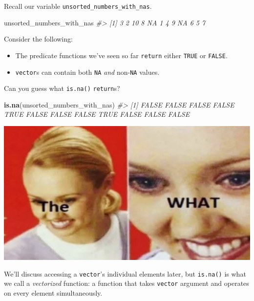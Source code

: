 \documentclass[
]{report}
\newenvironment{Shaded}{\begin{snugshade}}{\end{snugshade}}
\newcommand{\CommentTok}[1]{\textcolor[rgb]{0.56,0.35,0.01}{\textit{#1}}}
\newcommand{\KeywordTok}[1]{\textcolor[rgb]{0.13,0.29,0.53}{\textbf{#1}}}
\newcommand{\NormalTok}[1]{#1}
\providecommand{\tightlist}{%
  \setlength{\itemsep}{0pt}\setlength{\parskip}{0pt}}
\begin{document}
Recall our variable \texttt{unsorted\_numbers\_with\_nas}.

\begin{Shaded}
\begin{Highlighting}[]
\NormalTok{unsorted\_numbers\_with\_nas}
\CommentTok{\#\textgreater{}  [1]  3  2 10  8 NA  1  4  9 NA  6  5  7}
\end{Highlighting}
\end{Shaded}

Consider the following:

\begin{itemize}
\tightlist
\item
  The predicate functions we've seen so far \texttt{return} either \texttt{TRUE} or \texttt{FALSE}.
\item
  \texttt{vector}s can contain both \texttt{NA} \emph{and} non-\texttt{NA} values.
\end{itemize}

Can you guess what \texttt{is.na()} \texttt{return}s?

\begin{Shaded}
\begin{Highlighting}[]
\KeywordTok{is.na}\NormalTok{(unsorted\_numbers\_with\_nas)}
\CommentTok{\#\textgreater{}  [1] FALSE FALSE FALSE FALSE  TRUE FALSE FALSE FALSE  TRUE FALSE FALSE FALSE}
\end{Highlighting}
\end{Shaded}

\begin{center}\includegraphics[width=1\linewidth]{images/the-what} \end{center}

We'll discuss accessing a \texttt{vector}'s individual elements later, but \texttt{is.na()} is what we call a \emph{vectorized} function: a function that takes \texttt{vector} argument and operates on every element simultaneously.
\end{document}
